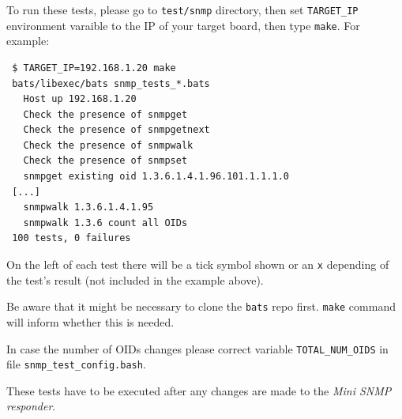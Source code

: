 \documentclass[a4paper, 12pt]{article}
\begin{document}
To run these tests, please go to \texttt{test/snmp} directory, then set
\texttt{TARGET\_IP} environment varaible to the IP of your target board, then type
\texttt{make}. For example:
\begin{lstlisting}
 $ TARGET_IP=192.168.1.20 make
 bats/libexec/bats snmp_tests_*.bats
   Host up 192.168.1.20
   Check the presence of snmpget
   Check the presence of snmpgetnext
   Check the presence of snmpwalk
   Check the presence of snmpset
   snmpget existing oid 1.3.6.1.4.1.96.101.1.1.1.0
 [...]
   snmpwalk 1.3.6.1.4.1.95
   snmpwalk 1.3.6 count all OIDs
 100 tests, 0 failures
\end{lstlisting}
On the left of each test there will be a tick symbol shown or an \texttt{x}
depending of the test's result (not included in the example above).

Be aware that it might be necessary to clone the \texttt{bats} repo first.
\texttt{make} command will inform whether this is needed.

In case the number of OIDs changes please correct variable \texttt{TOTAL\_NUM\_OIDS}
in file \texttt{snmp\_test\_config.bash}.

These tests have to be executed after any changes are made to the \textit{Mini SNMP
responder}.
\end{document}

